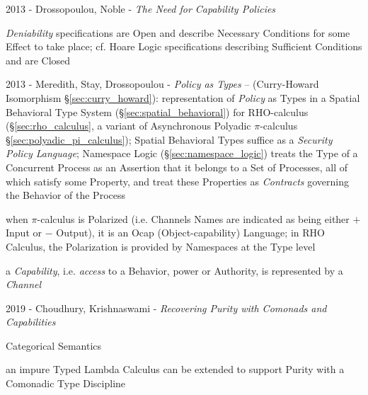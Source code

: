 2013 - Drossopoulou, Noble - \emph{The Need for Capability Policies}

\emph{Deniability} specifications are Open and describe Necessary Conditions for
some Effect to take place; cf. Hoare Logic specifications describing Sufficient
Conditions and are Closed

2013 - Meredith, Stay, Drossopoulou - \emph{Policy as Types} -- (Curry-Howard
Isomorphism \S\ref{sec:curry_howard}): representation of \emph{Policy} as Types
in a Spatial Behavioral Type System (\S\ref{sec:spatial_behavioral}) for
RHO-calculus (\S\ref{sec:rho_calculus}, a variant of Asynchronous Polyadic
$\pi$-calculus \S\ref{sec:polyadic_pi_calculus}); Spatial Behavioral Types
suffice as a \emph{Security Policy Language}; Namespace Logic
(\S\ref{sec:namespace_logic}) treats the Type of a Concurrent Process as an
Assertion that it belongs to a Set of Processes, all of which satisfy some
Property, and treat these Properties as \emph{Contracts} governing the Behavior
of the Process

when $\pi$-calculus is Polarized (i.e. Channels Names are indicated as being
either $+$ Input or $-$ Output), it is an Ocap (Object-capability) Language; in
RHO Calculus, the Polarization is provided by Namespaces at the Type level

a \emph{Capability}, i.e. \emph{access} to a Behavior, power or Authority, is
represented by a \emph{Channel}

2019 - Choudhury, Krishnaswami -
\emph{Recovering Purity with Comonads and Capabilities}

Categorical Semantics

an impure Typed Lambda Calculus can be extended to support Purity with a
Comonadic Type Discipline
